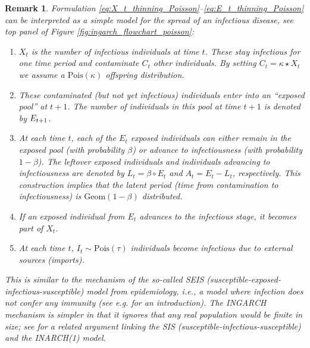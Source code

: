 \documentclass{article}
\newtheorem{remark}{Remark}
\begin{document}
\begin{remark}
\label{remark:interpretation}
Formulation \eqref{eq:X_t_thinning_Poisson}--\eqref{eq:E_t_thinning_Poisson} can be interpreted as a simple model for the spread of an infectious disease, see top panel of Figure \ref{fig:ingarch_flowchart_poisson}:

\begin{enumerate}
\item $X_t$ is the number of infectious individuals at time $t$. These stay infectious for one time period and \textit{contaminate} $C_t$ other individuals. By setting $C_t = \kappa \star X_t$ we assume a $\text{Pois}(\kappa)$ offspring distribution.
\item These contaminated (but not yet infectious) individuals enter into an ``\textit{exposed pool}'' at $t + 1$. The number of individuals in this pool at time $t + 1$ is denoted by $E_{t + 1}$.
\item At each time $t$, each of the $E_t$ exposed individuals can either remain in the exposed pool (with probability $\beta$) or advance to infectiousness (with probability $1 - \beta$). The \textit{leftover} exposed individuals and individuals \textit{advancing} to infectiousness are denoted by $L_t = \beta \circ E_t$ and $A_t = E_t - L_t$, respectively. This construction implies that the latent period (time from contamination to infectiousness) is $\text{Geom}(1- \beta)$ distributed. %
\item If an exposed individual from $E_t$ advances to the infectious stage, it becomes part of $X_t$. %
\item At each time $t$, $I_t \sim \text{Pois}(\tau)$ individuals become infectious due to external sources (\textit{imports}).
\end{enumerate}
This is similar to the mechanism of the so-called SEIS (susceptible-exposed-infectious-susceptible) model from epidemiology, i.e., a model where infection does not confer any immunity (see e.g. \citep{Britton2019} for an introduction). The INGARCH mechanism is simpler in that it ignores that any real population would be finite in size; see \citep{Bauer2018} for a related argument linking the SIS (susceptible-infectious-susceptible) and the INARCH(1) model.
\end{remark}
\end{document}
